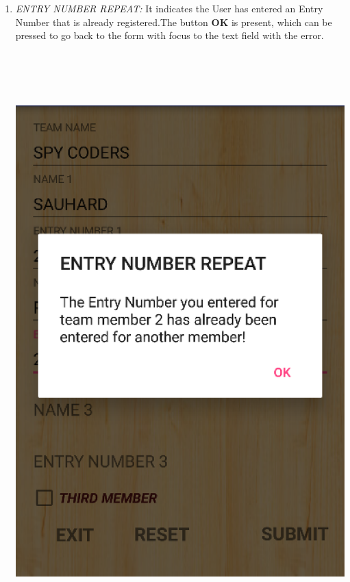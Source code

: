 \documentclass[12pt]{article}
\begin{document}
\begin{itemize}
\begin{enumerate}
\begin{enumerate}
            \item \textit{ENTRY NUMBER REPEAT:} It indicates the User has entered an Entry Number that is already registered.The button \textbf{OK} is present, which can be pressed to go back to the form with focus to the text field with the error.\\
            \\
            \\
            \\
            \\
            \par
             \begin{minipage}{\linewidth}
        	    \centering
        	    \includegraphics[scale=.7]{ENTRY_NUMBER_REPEAT.png}
            \end{minipage}
            \\
            \\
            

\end{enumerate}
\end{enumerate}
\end{itemize}
\end{document}

